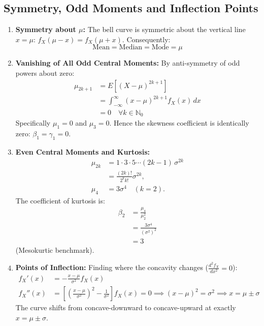 \documentclass[12pt,a4paper]{article}
\begin{document}
\subsection{Symmetry, Odd Moments and Inflection Points}
\begin{enumerate}[leftmargin=*, itemsep=3pt]
  \item \textbf{Symmetry about $\mu$:} The bell curve is symmetric about the vertical line $x = \mu$: $f_X(\mu - x) = f_X(\mu + x)$. Consequently:
  \begin{equation}
    \text{Mean} = \text{Median} = \text{Mode} = \mu
  \end{equation}
  \item \textbf{Vanishing of All Odd Central Moments:} By anti-symmetry of odd powers about zero:
  \begin{equation}
    \begin{aligned}
      \mu_{2k+1} &= E[(X - \mu)^{2k+1}] \\[3pt]
      &= \int_{-\infty}^\infty (x-\mu)^{2k+1} f_X(x) \, dx \\[3pt]
      &= 0 \quad \forall k \in \mathbb{N}_0
    \end{aligned}
  \end{equation}
  Specifically $\mu_1 = 0$ and $\mu_3 = 0$. Hence the skewness coefficient is identically zero: $\beta_1 = \gamma_1 = 0$.
  \item \textbf{Even Central Moments and Kurtosis:}
  \begin{equation}
    \begin{aligned}
      \mu_{2k} &= 1 \cdot 3 \cdot 5 \cdots (2k-1) \, \sigma^{2k} \\[3pt]
      &= \frac{(2k)!}{2^k k!} \sigma^{2k}, \\
      \mu_4 &= 3\sigma^4 \quad (k=2).
    \end{aligned}
  \end{equation}
  The coefficient of kurtosis is:
  \[
    \begin{aligned}
      \beta_2 &= \frac{\mu_4}{\mu_2^2} \\[3pt]
      &= \frac{3\sigma^4}{(\sigma^2)^2} \\[3pt]
      &= 3
    \end{aligned}
  \]
   (Mesokurtic benchmark).
  \item \textbf{Points of Inflection:} Finding where the concavity changes ($\frac{d^2 f_X}{dx^2} = 0$):
  \begin{align}
    f_X'(x) &= -\frac{x - \mu}{\sigma^2} f_X(x) \\[2pt]
    f_X''(x) &= \left[\left(\frac{x - \mu}{\sigma^2}\right)^2 - \frac{1}{\sigma^2}\right] f_X(x) = 0 \implies (x - \mu)^2 = \sigma^2 \implies x = \mu \pm \sigma
  \end{align}
  The curve shifts from concave-downward to concave-upward at exactly $x = \mu \pm \sigma$.
\end{enumerate}
\end{document}
